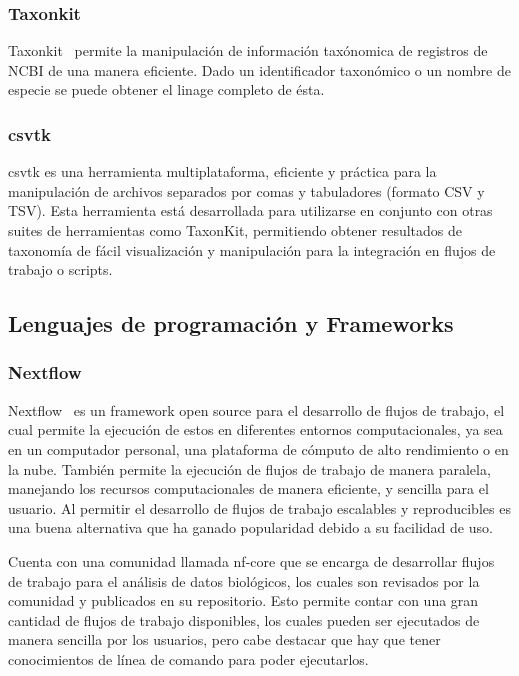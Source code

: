 

\subsubsection{Taxonkit}
Taxonkit~\cite{SHEN2021844} permite la manipulación de información taxónomica de registros de NCBI de una manera eficiente. Dado un identificador taxonómico o un nombre de especie se puede obtener el linage completo de ésta.

\subsubsection{csvtk}
csvtk es una herramienta multiplataforma, eficiente y práctica para la manipulación de archivos separados por comas y tabuladores (formato CSV y TSV). 
Esta herramienta está desarrollada para utilizarse en conjunto con otras suites de herramientas como TaxonKit, permitiendo obtener resultados de taxonomía de fácil visualización y manipulación para la integración en flujos de trabajo o scripts.
\subsection{Lenguajes de programación y Frameworks}
\subsubsection{Nextflow}
Nextflow~\cite{di2017nextflow} es un framework open source para el desarrollo de flujos de trabajo, el cual permite la ejecución de estos en diferentes entornos computacionales, ya sea en un computador personal, una plataforma de cómputo de alto rendimiento o en la nube. También permite la ejecución de flujos de trabajo de manera paralela, manejando los recursos computacionales de manera eficiente, y sencilla para el usuario.
 Al permitir el desarrollo de flujos de trabajo escalables y reproducibles es una buena alternativa que ha ganado popularidad debido a su facilidad de uso.

Cuenta con una comunidad llamada nf-core que se encarga de desarrollar flujos de trabajo para el análisis de datos biológicos, los cuales son revisados por la comunidad y publicados en su repositorio. Esto permite contar con una gran cantidad de flujos de trabajo disponibles, los cuales pueden ser ejecutados de manera sencilla por los usuarios, pero cabe destacar que hay que tener conocimientos de línea de comando para poder ejecutarlos.




